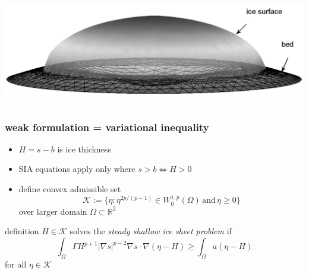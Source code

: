 \documentclass[hide notes,intlimits]{beamer}
\newcommand{\RR}{\mathbb{R}}
\newcommand{\Kcal}{\mathcal{K}}
\newcommand{\grad}{\nabla}
\begin{document}
\begin{frame}
\begin{columns}
\begin{column}{0.55\textwidth}
\begin{center}
\vspace{10mm}
\includegraphics[width=1.05\textwidth]{capnonflatobs}
\end{center}
\end{column}
\end{columns}
\end{frame}


\begin{frame}
  \frametitle{weak formulation = variational inequality} 

\begin{itemize}
\item $H=s-b$ is ice thickness
\item SIA equations apply only where $s>b \iff H > 0$
\item define convex admissible set
  $$\Kcal := \{\eta : \eta^{2p/(p-1)} \in W^{1,p}_0 (\Omega) \,\text{and}\, \eta \ge 0\}$$
over larger domain $\Omega \subset \RR^2$
\end{itemize}

\begin{block}{definition} 
$H \in \Kcal$ solves the \emph{steady shallow ice sheet problem} if
  $$\int_{\Omega}  \Gamma H^{p+1} |\grad s|^{p-2} \grad s \cdot \grad(\eta - H)  
\ge \int_{\Omega} a (\eta - H)$$
for all $\eta \in \Kcal$
\end{block}
\end{frame}
\end{document}
